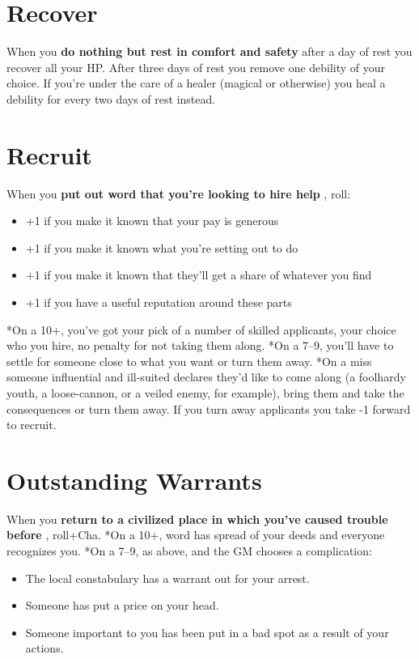 \section{Recover}


 When you \textbf{do nothing but rest in comfort and safety}
 after a day of rest you recover all your HP. After three days of rest you remove one debility of your choice. If you're under the care of a healer (magical or otherwise) you heal a debility for every two days of rest instead.
\section{Recruit}


 When you \textbf{put out word that you're looking to hire help}
, roll: 
\begin{itemize}
\item +1 if you make it known that your pay is generous
\item +1 if you make it known what you're setting out to do
\item +1 if you make it known that they'll get a share of whatever you find
\item +1 if you have a useful reputation around these parts

\end{itemize}


 *On a 10+, you've got your pick of a number of skilled applicants, your choice who you hire, no penalty for not taking them along. *On a 7--9, you'll have to settle for someone close to what you want or turn them away. *On a miss someone influential and ill-suited declares they'd like to come along (a foolhardy youth, a loose-cannon, or a veiled enemy, for example), bring them and take the consequences or turn them away. If you turn away applicants you take -1 forward to recruit.
\section{Outstanding Warrants}


 When you \textbf{return to a civilized place in which you've caused trouble before}
, roll+Cha. *On a 10+, word has spread of your deeds and everyone recognizes you. *On a 7--9, as above, and the GM chooses a complication:
\begin{itemize}
\item The local constabulary has a warrant out for your arrest.
\item Someone has put a price on your head.
\item Someone important to you has been put in a bad spot as a result of your actions.

\end{itemize}


